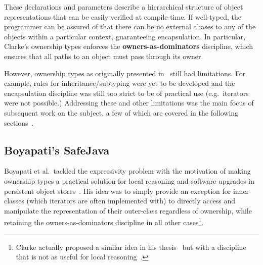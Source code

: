 \documentclass{acm_proc_article-sp}
\begin{document}
These declarations and parameters describe a hierarchical structure of object
representations that can be easily verified at compile-time. If well-typed, the
programmer can be assured of that \linebreak there can be no external aliases
to any of the objects within a particular context, guaranteeing encapsulation.
In particular, Clarke's ownership types enforces the
\textbf{owners-as-dominators} discipline, which ensures that all paths to an
object must pass through its owner.

However, ownership types as originally presented in~\cite{clarke98ownership}
still had limitations. For example, rules for inheritance/subtyping were yet to
be developed and the encapsulation discipline was still too strict to be of
practical use (e.g.\ iterators were not possible.) Addressing these and other
limitations was the main focus of subsequent work on the subject, a few of
which are covered in the following sections~\cite{boyapati04safejava,
boyapati03innerclass, cunningham08ut, dietl11gut, cameron07mojo}.

%
%
%


\subsection{Boyapati's SafeJava}
\label{subsec:boyapati}

Boyapati et al.\ tackled the expressivity problem with the motivation of making
ownership types a practical solution for local reasoning and software upgrades
in persistent object stores~\cite{boyapati03innerclass}. His idea was to simply
provide an exception for inner-classes (which iterators are often implemented
with) to directly access and manipulate the representation of their outer-class
regardless of ownership, while retaining the owners-as-dominators discipline in
all other cases\footnote{Clarke actually proposed a similar idea in his
thesis~\cite{clarke03ownership} but with a discipline that is not as useful for
local reasoning~\cite{boyapati03innerclass}.}.
\end{document}
